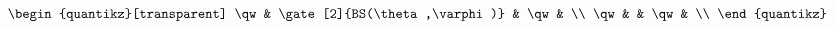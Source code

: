 \documentclass[10pt]{article}
\begin{document}
\[\begin{quantikz}[transparent]
    \qw & \gate[2]{BS(\theta,\varphi)} & \qw & \\
    \qw &                                            &  \qw & \\
\end{quantikz}
\]
\end{document}
